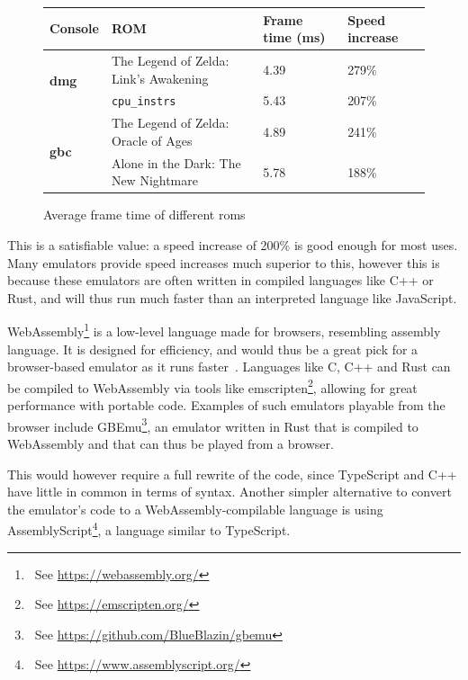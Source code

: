 \documentclass[11pt]{informatics-report}
\newcommand{\ftnt}[1]{\footnote{~See \url{#1}}}
\begin{document}
\begin{figure}[h]
    \centering
    \begin{tabular}{|l|l|l|l|}
    \hline
    \textbf{Console} & \textbf{ROM} & \textbf{Frame time} (ms) & \textbf{Speed increase} \\ \hline

	\multirow{2}{*}{\textbf{\gls{dmg}}}
	& The Legend of Zelda: Link's Awakening & 4.39 & 279\% \\\cline{2-4}
	& \texttt{cpu\_instrs} & 5.43 & 207\% \\\hline
	\multirow{2}{*}{\textbf{\gls{gbc}}}
	& The Legend of Zelda: Oracle of Ages & 4.89 & 241\% \\\cline{2-4}
	& Alone in the Dark: The New Nightmare & 5.78 & 188\% \\\hline

    \end{tabular}
    \caption{Average frame time of different \glspl{rom}}
    \label{fig:frame-time-results}
\end{figure}

This is a satisfiable value: a speed increase of 200\% is good enough for most uses. Many emulators provide speed increases much superior to this, however this is because these emulators are often written in compiled languages like C++ or Rust, and will thus run much faster than an interpreted language like JavaScript.

WebAssembly\ftnt{https://webassembly.org/} is a low-level language made for browsers, resembling assembly language. It is designed for efficiency, and would thus be a great pick for a browser-based emulator as it runs faster~\cite{wasm-faster}. Languages like C, C++ and Rust can be compiled to WebAssembly via tools like emscripten\ftnt{https://emscripten.org/}, allowing for great performance with portable code. Examples of such emulators playable from the browser include GBEmu\ftnt{https://github.com/BlueBlazin/gbemu}, an emulator written in Rust that is compiled to WebAssembly and that can thus be played from a browser.


This would however require a full rewrite of the code, since TypeScript and C++ have little in common in terms of syntax. Another simpler alternative to convert the emulator's code to a WebAssembly-compilable language is using AssemblyScript\ftnt{https://www.assemblyscript.org/}, a language similar to TypeScript.
\end{document}
